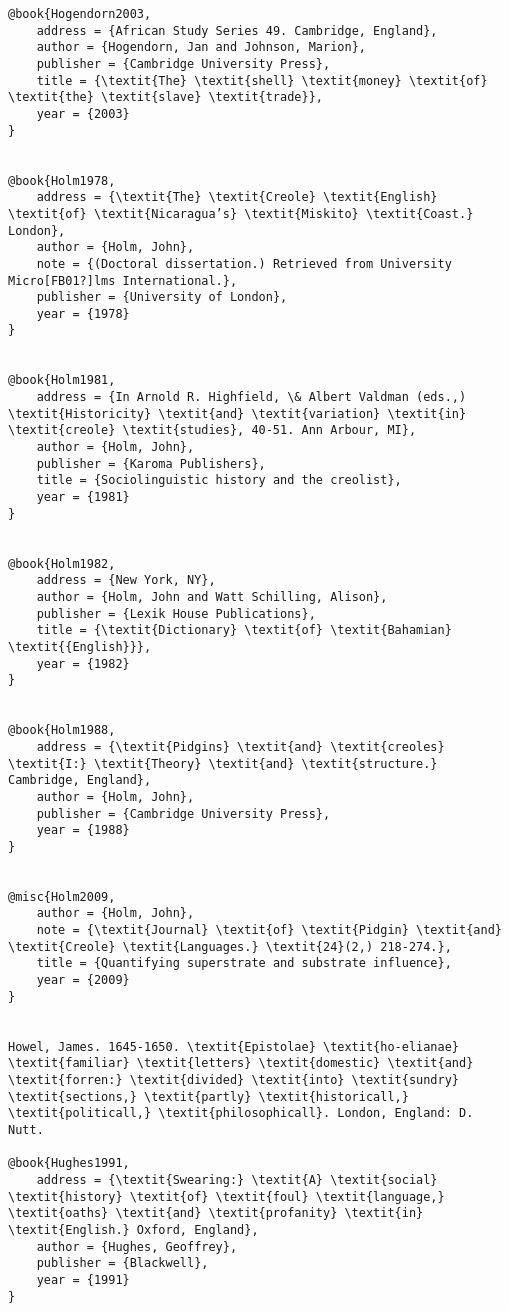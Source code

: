 \begin{verbatim}
@book{Hogendorn2003,
	address = {African Study Series 49. Cambridge, England},
	author = {Hogendorn, Jan and Johnson, Marion},
	publisher = {Cambridge University Press},
	title = {\textit{The} \textit{shell} \textit{money} \textit{of} \textit{the} \textit{slave} \textit{trade}},
	year = {2003}
}


@book{Holm1978,
	address = {\textit{The} \textit{Creole} \textit{English} \textit{of} \textit{Nicaragua’s} \textit{Miskito} \textit{Coast.}  London},
	author = {Holm, John},
	note = {(Doctoral dissertation.) Retrieved from University Micro[FB01?]lms International.},
	publisher = {University of London},
	year = {1978}
}


@book{Holm1981,
	address = {In Arnold R. Highfield, \& Albert Valdman (eds.,) \textit{Historicity} \textit{and} \textit{variation} \textit{in} \textit{creole} \textit{studies}, 40-51. Ann Arbour, MI},
	author = {Holm, John},
	publisher = {Karoma Publishers},
	title = {Sociolinguistic history and the creolist},
	year = {1981}
}


@book{Holm1982,
	address = {New York, NY},
	author = {Holm, John and Watt Schilling, Alison},
	publisher = {Lexik House Publications},
	title = {\textit{Dictionary} \textit{of} \textit{Bahamian} \textit{{English}}},
	year = {1982}
}


@book{Holm1988,
	address = {\textit{Pidgins} \textit{and} \textit{creoles} \textit{I:} \textit{Theory} \textit{and} \textit{structure.} Cambridge, England},
	author = {Holm, John},
	publisher = {Cambridge University Press},
	year = {1988}
}


@misc{Holm2009,
	author = {Holm, John},
	note = {\textit{Journal} \textit{of} \textit{Pidgin} \textit{and} \textit{Creole} \textit{Languages.} \textit{24}(2,) 218-274.},
	title = {Quantifying superstrate and substrate influence},
	year = {2009}
}


Howel, James. 1645-1650. \textit{Epistolae} \textit{ho-elianae} \textit{familiar} \textit{letters} \textit{domestic} \textit{and} \textit{forren:} \textit{divided} \textit{into} \textit{sundry} \textit{sections,} \textit{partly} \textit{historicall,} \textit{politicall,} \textit{philosophicall}. London, England: D. Nutt.

@book{Hughes1991,
	address = {\textit{Swearing:} \textit{A} \textit{social} \textit{history} \textit{of} \textit{foul} \textit{language,} \textit{oaths} \textit{and} \textit{profanity} \textit{in} \textit{English.} Oxford, England},
	author = {Hughes, Geoffrey},
	publisher = {Blackwell},
	year = {1991}
}



\end{verbatim}

